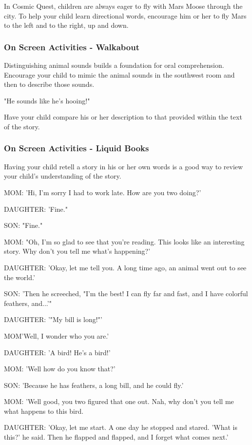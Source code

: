 In Cosmic Quest, children are always eager to fly with Mars Moose through the city.
To help your child learn directional words, encourage him or her to fly Mars to the left and to the right, up and down.

\subsubsection{On Screen Activities - Walkabout}
Distinguishing animal sounds builds a foundation for oral comprehension.
Encourage your child to mimic the animal sounds in the southwest room and then to describe those sounds.

"He sounds like he's hooing!"

Have your child compare his or her description to that provided within the text of the story.

\subsubsection{On Screen Activities - Liquid Books}

Having your child retell a story in his or her own words is a good way to review your child's understanding of the story.

MOM: 'Hi, I'm sorry I had to work late. How are you two doing?'

DAUGHTER: 'Fine."

SON: "Fine."

MOM: "Oh, I'm so glad to see that you're reading. This looks like an interesting story. Why don't you tell me what's happening?'

DAUGHTER: 'Okay, let me tell you. A long time ago, an animal went out to see the world.'

SON: 'Then he screeched, "I'm the best! I can fly far and fast, and I have colorful feathers, and...'"

DAUGHTER: '"My bill is long!"'

MOM'Well, I wonder who you are.'

DAUGHTER: 'A bird! He's a bird!'

MOM: 'Well how do you know that?'

SON: 'Because he has feathers, a long bill, and he could fly.'

MOM: 'Well good, you two figured that one out. Nah, why don't you tell me what happens to this bird.

DAUGHTER: 'Okay, let me start. A one day he stopped and stared. 'What is this?' he said. Then he flapped and flapped, and I forget what comes next.'

